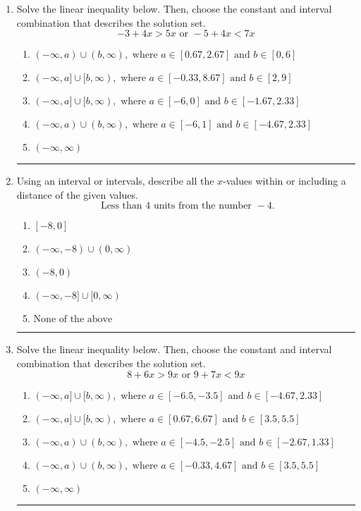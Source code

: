 \documentclass[14pt]{extbook}
\newcommand{\litem}[1]{\item#1\hspace*{-1cm}\rule{\textwidth}{0.4pt}}
\begin{document}
\begin{enumerate}
{\begin{enumerate}[label=\Alph*.]
\end{enumerate} }
\litem{
Solve the linear inequality below. Then, choose the constant and interval combination that describes the solution set.\[ -3 + 4 x > 5 x \text{ or } -5 + 4 x < 7 x \]\begin{enumerate}[label=\Alph*.]
\item \( (-\infty, a) \cup (b, \infty), \text{ where } a \in [0.67, 2.67] \text{ and } b \in [0, 6] \)
\item \( (-\infty, a] \cup [b, \infty), \text{ where } a \in [-0.33, 8.67] \text{ and } b \in [2, 9] \)
\item \( (-\infty, a] \cup [b, \infty), \text{ where } a \in [-6, 0] \text{ and } b \in [-1.67, 2.33] \)
\item \( (-\infty, a) \cup (b, \infty), \text{ where } a \in [-6, 1] \text{ and } b \in [-4.67, 2.33] \)
\item \( (-\infty, \infty) \)

\end{enumerate} }
\litem{
Using an interval or intervals, describe all the $x$-values within or including a distance of the given values.\[ \text{ Less than } 4 \text{ units from the number } -4. \]\begin{enumerate}[label=\Alph*.]
\item \( [-8, 0] \)
\item \( (-\infty, -8) \cup (0, \infty) \)
\item \( (-8, 0) \)
\item \( (-\infty, -8] \cup [0, \infty) \)
\item \( \text{None of the above} \)

\end{enumerate} }
\litem{
Solve the linear inequality below. Then, choose the constant and interval combination that describes the solution set.\[ 8 + 6 x > 9 x \text{ or } 9 + 7 x < 9 x \]\begin{enumerate}[label=\Alph*.]
\item \( (-\infty, a] \cup [b, \infty), \text{ where } a \in [-6.5, -3.5] \text{ and } b \in [-4.67, 2.33] \)
\item \( (-\infty, a] \cup [b, \infty), \text{ where } a \in [0.67, 6.67] \text{ and } b \in [3.5, 5.5] \)
\item \( (-\infty, a) \cup (b, \infty), \text{ where } a \in [-4.5, -2.5] \text{ and } b \in [-2.67, 1.33] \)
\item \( (-\infty, a) \cup (b, \infty), \text{ where } a \in [-0.33, 4.67] \text{ and } b \in [3.5, 5.5] \)
\item \( (-\infty, \infty) \)


\end{enumerate}}
\end{enumerate}
\end{document}
